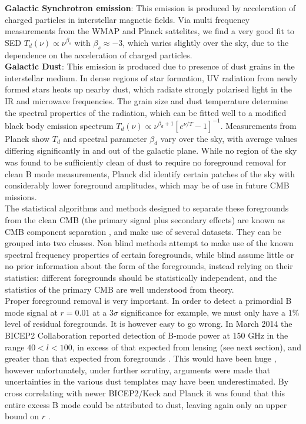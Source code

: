 \documentclass[a4paper,10pt]{article}
\begin{document}
\textbf{Galactic Synchrotron emission}: This emission is produced by acceleration of charged particles in interstellar magnetic fields. Via multi frequency measurements from the WMAP and Planck sattelites, we find a very good fit to SED $T_d(\nu) \propto \nu^{\beta_s}$ with $\beta_s \approx -3$, which varies slightly over the sky, due to the dependence on the acceleration of charged particles.\\

\textbf{Galactic Dust}: This emission is produced due to presence of dust grains in the interstellar medium. In dense regions of star formation, UV radiation from newly formed stars heats up nearby dust, which radiate strongly polarised light in the IR and microwave frequencies. The grain size and dust temperature determine the spectral properties of the radiation, which can be fitted well to a modified black body emission spectrum $T_d(\nu) \propto \nu ^ {\beta_d+1}[e^{\nu/T}-1]^{-1}$. Measurements from Planck show $T_d$ and spectral parameter $\beta_d$ vary over the sky, with average values differing significantly in and out of the galactic plane. While no region of the sky was found to be sufficiently clean of dust to require no foreground removal for clean B mode measurements, Planck did identify certain patches of the sky with considerably lower foreground amplitudes, which may be of use in future CMB missions. \\

The statistical algorithms and methods designed to separate these foregrounds from the clean CMB (the primary signal plus secondary effects) are known as CMB component separation \cite{componentsep}, and make use of several datasets. They can be grouped into two classes. Non blind methods attempt to make use of the known spectral frequency properties of certain foregrounds, while blind assume little or no prior information about the form of the foregrounds, instead relying on their statistics: different foregrounds should be statistically independent, and the statistics of the primary CMB are well understood from theory.\\

Proper foreground removal is very important. In order to detect a primordial B mode signal at $r=0.01$ at a $3\sigma$ significance for example, we must only have a $1\%$ level of residual foregrounds. It is however easy to go wrong. In March 2014 the BICEP2 Collaboration reported detection of B-mode power at 150 GHz in the range $40<l<100$, in excess of that expected from lensing (see next section), and greater than that expected from foregrounds \cite{bicep2cockup}. This would have been huge \cite{smokinggun}, however unfortunately, under further scrutiny, arguments were made that uncertainties in the various dust templates may have been underestimated. By cross correlating with newer BICEP2/Keck and Planck it was found that this entire excess B mode could be attributed to dust, leaving again only an upper bound on $r$ \cite{bicep2cockup2}.
\end{document}
